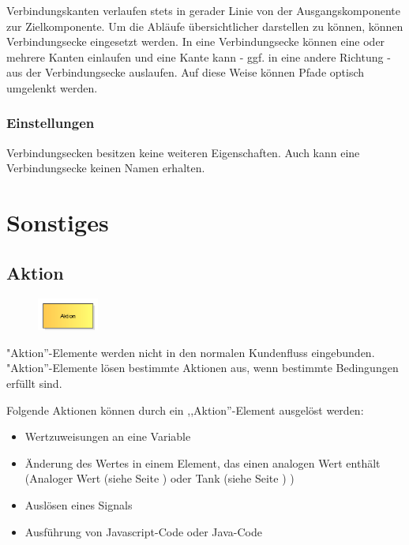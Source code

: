 Verbindungskanten verlaufen stets in gerader Linie von der Ausgangskomponente zur Zielkomponente.
Um die Abläufe übersichtlicher darstellen zu können, können Verbindungsecke eingesetzt werden. In eine Verbindungsecke können eine
oder mehrere Kanten einlaufen und eine Kante kann - ggf. in eine andere Richtung - aus der Verbindungsecke auslaufen. Auf diese Weise
können Pfade optisch umgelenkt werden.

\subsection*{Einstellungen}

Verbindungsecken besitzen keine weiteren Eigenschaften. Auch kann eine Verbindungsecke keinen Namen erhalten.





\chapter{Sonstiges}

\section{Aktion}
\label{ref:ModelElementAction}

\begin{figure}
\vspace{-22pt}
\includegraphics[width=2cm]{imageModelElementAction.png}
\vspace{-22pt}
\end{figure}

"Aktion''-Elemente werden nicht in den normalen Kundenfluss eingebunden.
"Aktion''-Elemente lösen bestimmte Aktionen aus, wenn bestimmte Bedingungen erfüllt sind.

Folgende Aktionen können durch ein ,,Aktion''-Element ausgelöst werden:

\begin{itemize}
  \item Wertzuweisungen an eine Variable 
  \item Änderung des Wertes in einem Element, das einen analogen Wert enthält
  (Analoger Wert (siehe Seite \pageref{ref:ModelElementAnalogValue}) oder Tank (siehe Seite \pageref{ref:ModelElementTank}) )
  \item Auslösen eines Signals 
  \item Ausführung von Javascript-Code oder Java-Code 
\end{itemize}

